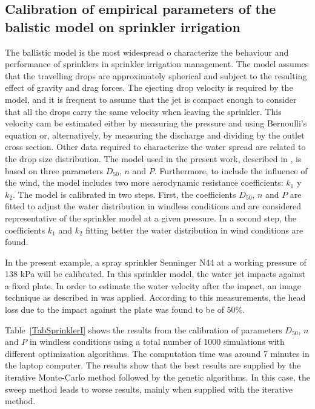 \documentclass[review,authoryear]{elsarticle}
\begin{document}
\subsection{Calibration of empirical parameters of the balistic model on
sprinkler irrigation}

The ballistic model \citep{Fukui80,Playan06} is the most widespread o characterize the behaviour and performance of sprinklers in sprinkler irrigation management. The model assumes that the travelling drops are approximately spherical and subject to the resulting effect of gravity and drag forces. The ejecting drop velocity is required by the model, and it is frequent to assume that the jet is compact enough to consider that all the drops carry the same velocity when leaving the sprinkler. This velocity cam be estimated either by measuring the pressure and using Bernoulli's equation or, alternatively, by measuring the discharge and dividing by the outlet cross section. Other data required to characterize the water spread are related to the drop size distribution. The model used in the present work, described in \cite{Ouazaa14}, is based on three parameters $D_{50}$, $n$ and $P$. Furthermore, to include the influence of the wind, the model includes two more aerodynamic resistance coefficients:
$k_1$ y $k_2$.
The model is calibrated in two steps. First, the coefficients $D_{50}$, $n$ and $P$ are fitted to adjust the water distribution in windless conditions and are considered representative of the sprinkler model at a given pressure. In a second step, the coefficients $k_1$ and $k_2$ fitting better the water distribution in wind conditions are found.

In the present example, a spray sprinkler Senninger N44 at a working pressure of 138 kPa will be calibrated. In this sprinkler model, the water jet impacts against a fixed plate. In order to estimate the water velocity after the impact, an image technique as described in \citet{Salvador09} was applied. According to this measurements, the head loss due to the impact against the plate was found to be of 50\%.

Table~\ref{TabSprinklerI} shows the results from the calibration of parameters $D_{50}$, $n$ and $P$ in windless conditions using a total number of 1000 simulations with different optimization algorithms. The computation time was around 7 minutes in the laptop computer. The results show that the best results are supplied by the iterative Monte-Carlo method followed by the genetic algorithms. In this case, the sweep method leads to worse results, mainly when supplied with the iterative method. 
\end{document}
